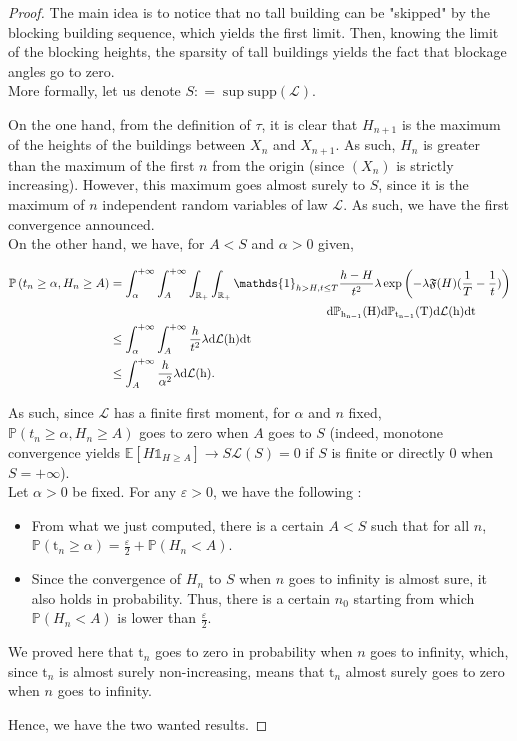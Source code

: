 \documentclass[10pt,english,a4paper]{smfart}
\theoremstyle{definition}
\theoremstyle{remark}
\newcommand{\R}{\mathbb{R}}
\newcommand{\primi}{\mathfrak{F}}
\newcommand{\p}{\mathbb{P}}
\newcommand{\e}{\mathbb{E}}
\renewcommand{\epsilon}{\varepsilon}
\begin{document}
\begin{proof}
The main idea is to notice that no tall building can be "skipped" by the blocking building sequence, which yields the first limit. Then, knowing the limit of the blocking heights, the sparsity of tall buildings yields the fact that blockage angles go to zero.\\

More formally, let us denote $S : = \sup \mathrm{supp}(\mathcal{L})$. 

On the one hand, from the definition of $\tau$, it is clear that $H_{n+1}$ is the maximum of the heights of the buildings between $X_n$ and $X_{n+1}$. As such, $H_n$ is greater than the maximum of the first $n$ from the origin (since $(X_n)$ is strictly increasing). However, this maximum goes almost surely to $S$, since it is the maximum of $n$ independent random variables of law $\mathcal{L}$. As such, we have the first convergence announced.\\

On the other hand, we have, for $A<S$ and $\alpha>0$ given,

\begin{align*}
    \p\left(t_n\geq \alpha, H_n\geq A\right) &= \int_\alpha^{+\infty}\int_{A}^{+\infty}\int_{\R_+}\int_{\R_+} \mathds{1}_{h> H, t\leq  T} \frac{h-H}{t^2}\lambda \exp\left(-\lambda \primi(H)(\frac{1}{T}-\frac{1}{t})\right)\\
    & \qquad\qquad\qquad\qquad\qquad\qquad\qquad\qquad\qquad\rm{d}\p_{h_{n-1}}(H)\rm{d}\p_{t_{n-1}}(T)\rm{d}\mathcal{L}(h)dt\\
     &\leq \int_\alpha^{+\infty}\int_{A}^{+\infty}\frac{h}{t^2}\lambda \rm{d}\mathcal{L}(h)dt\\
    &\leq \int_{A}^{+\infty}\frac{h}{\alpha^2}\lambda \rm{d}\mathcal{L}(h).
\end{align*}

As such, since $\mathcal{L}$ has a finite first moment, for $\alpha$ and $n$ fixed, $ \p\left(t_n\geq \alpha, H_n\geq A\right)$ goes to zero when $A$ goes to $S$ (indeed, monotone convergence yields $\e[H\mathds{1}_{H\geq A}]\rightarrow S\mathcal{L}(S) = 0$ if $S$ is finite or directly $0$ when $S = +\infty$).\\

Let $\alpha>0$ be fixed. For any $\epsilon>0$, we have the following :
\begin{itemize}
    \item From what we just computed, there is a certain $A< S$ such that for all $n$,  $\p\left(\mathrm{t}_n\geq \alpha\right) = \frac{\epsilon}{2}+ \p\left( H_n< A\right)$.
    \item Since the convergence of $H_n$ to $S$ when $n$ goes to infinity is almost sure, it also holds in probability. Thus, there is a certain $n_0$ starting from which $\p\left( H_n< A\right)$ is lower than $\frac{\epsilon}{2}$.
\end{itemize}
We proved here that $\mathrm{t}_n$ goes to zero in probability when $n$ goes to infinity, which, since $\mathrm{t}_n$ is almost surely non-increasing, means that $\mathrm{t}_n$ almost surely goes to zero when $n$ goes to infinity.

Hence, we have the two wanted results.
\end{proof}
\end{document}
